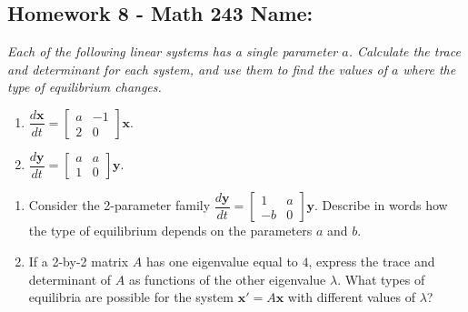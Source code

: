 \documentclass[10pt]{article}
\begin{document}
\pagestyle{empty}
\subsection*{Homework 8 - Math 243 \hfill Name: \underline{\hspace*{2in}}}


\noindent
\textit{Each of the following linear systems has a single parameter $a$. Calculate the trace and determinant for each system, and use them to find the values of $a$ where the type of equilibrium changes.}

\begin{multicols}{2}
\begin{enumerate}
\setcounter{enumi}{\theenumCount}

\item $\dfrac{d \mathbf{x}}{dt} = \begin{bmatrix} a & -1 \\ 2 & 0 \end{bmatrix} \mathbf{x}$. 

\item $\dfrac{d \mathbf{y}}{dt} = \begin{bmatrix} a & a \\ 1 & 0 \end{bmatrix} \mathbf{y}$. 

\setcounter{enumCount}{\theenumi}
\end{enumerate} 
\end{multicols}
\vfill



\begin{enumerate}
\setcounter{enumi}{\theenumCount}
\item Consider the 2-parameter family $\dfrac{d\mathbf{y}}{dt} = \begin{bmatrix} 1 & a \\ -b & 0 \end{bmatrix} \mathbf{y}$.  Describe in words how the type of equilibrium depends on the parameters $a$ and $b$.  
\vfill


\item If a 2-by-2 matrix $A$ has one eigenvalue equal to $4$, express the trace and determinant of $A$ as functions of the other eigenvalue $\lambda$. What types of equilibria are possible for the system $\mathbf{x}' = A \mathbf{x}$ with different values of $\lambda$? \vfill


\setcounter{enumCount}{\theenumi}
\end{enumerate} 
\end{document}
